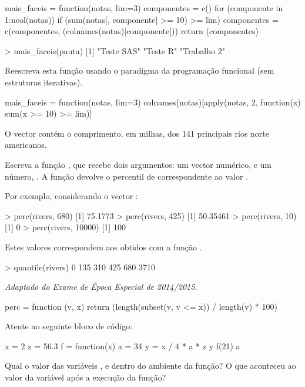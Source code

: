 \documentclass{exam}
\begin{document}
\begin{questions}
\begin{rcode}
	mais_faceis = function(notas, lim=3) {
		componentes = c()
		for (componente in 1:ncol(notas)) {
			if (sum(notas[, componente] >= 10) >= lim) {
				componentes = c(componentes, (colnames(notas)[componente]))
			}
		}
		return (componentes)
	}
	
	> mais_faceis(pauta)
	[1] "Teste SAS"  "Teste R"    "Trabalho 2"
\end{rcode}

Reescreva esta função usando o paradigma da programação funcional (sem estruturas iterativas).

\begin{solution}
	\begin{rcode}
		mais_faceis = function(notas, lim=3) {
			colnames(notas)[apply(notas, 2, function(x) sum(x >= 10) >= lim)]
		}
	\end{rcode}
\end{solution}

\question O vector  contém o comprimento, em milhas, dos 141 principais rios norte americanos.

Escreva a função , que recebe dois argumentos: um vector numérico,  e um número, . A função devolve o percentil de  correspondente ao valor .

Por exemplo, considerando o vector :

\begin{rcode}
	> perc(rivers, 680)
	[1] 75.1773
	> perc(rivers, 425)
	[1] 50.35461
	> perc(rivers, 10)
	[1] 0
	> perc(rivers, 10000)
	[1] 100
\end{rcode}

Estes valores correspondem aos obtidos com a função .

\begin{rcode}
	> quantile(rivers)
	0%
	135   310    425    680    3710 
\end{rcode}

{\footnotesize \textit{Adaptado do Exame de Época Especial de 2014/2015.}}

\begin{solution}
	\begin{rcode}
		perc = function (v, x) {
			return (length(subset(v, v <= x)) / length(v) * 100)
		}
	\end{rcode}
\end{solution}

\question Atente ao seguinte bloco de código:
\begin{rcode}
	x = 2
	z = 56.3
	f = function(x) {
		a = 34
		y = x / 4 * a * z
		y
	}
	f(21)
	a
\end{rcode}
Qual o valor das variáveis ,  e  dentro do ambiente da função? O que aconteceu ao valor da variável  após a execução da função?


\end{questions}
\end{document}
